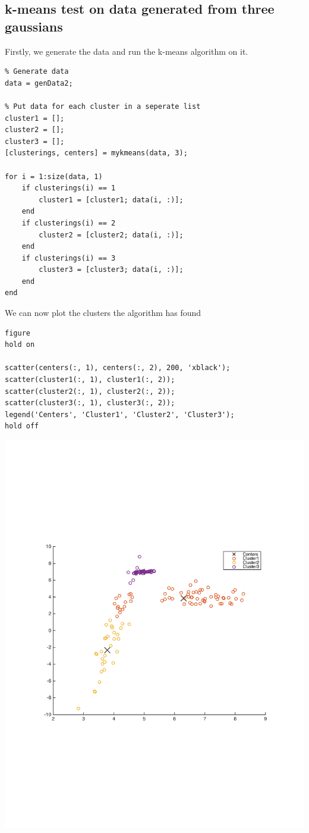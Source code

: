 \documentclass[11pt]{article}
\begin{document}
\subsection{k-means test on data generated from three gaussians} Firstly, we generate the data and run the k-means algorithm on it.
    \begin{lstlisting}
% Generate data
data = genData2;

% Put data for each cluster in a seperate list
cluster1 = [];
cluster2 = [];
cluster3 = [];
[clusterings, centers] = mykmeans(data, 3);

for i = 1:size(data, 1)
    if clusterings(i) == 1
        cluster1 = [cluster1; data(i, :)];
    end
    if clusterings(i) == 2
        cluster2 = [cluster2; data(i, :)];
    end
    if clusterings(i) == 3
        cluster3 = [cluster3; data(i, :)];
    end
end\end{lstlisting}
    
    We can now plot the clusters the algorithm has found
    \begin{lstlisting}
figure
hold on

scatter(centers(:, 1), centers(:, 2), 200, 'xblack');
scatter(cluster1(:, 1), cluster1(:, 2));
scatter(cluster2(:, 1), cluster2(:, 2));
scatter(cluster3(:, 1), cluster3(:, 2));
legend('Centers', 'Cluster1', 'Cluster2', 'Cluster3');
hold off\end{lstlisting}
    
    \begin{center}
    \includegraphics[width=\linewidth]{2-1}
    \end{center}
\end{document}
